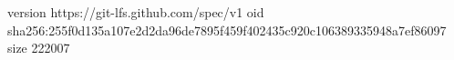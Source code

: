 version https://git-lfs.github.com/spec/v1
oid sha256:255f0d135a107e2d2da96de7895f459f402435c920c106389335948a7ef86097
size 222007
